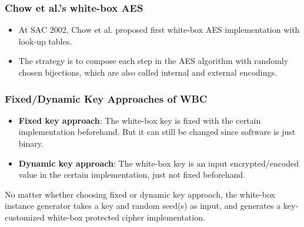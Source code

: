 \documentclass{beamer}
\begin{document}
\frame
{
\frametitle{Chow et al.'s white-box AES}
\begin{itemize}
\item At SAC 2002, Chow et al. proposed first white-box AES implementation with look-up tables.
\item The strategy is to compose each step in the AES algorithm with randomly chosen bijections, which are also called \textcolor[rgb]{1.00,0.00,0.00}{internal and external encodings}.
\end{itemize}

\begin{center}
\end{center}
}

\frame
{
\frametitle{Fixed/Dynamic Key Approaches of WBC}
\begin{itemize}
\item \textbf{Fixed key approach}: The white-box key is fixed with the certain implementation beforehand. \textcolor[rgb]{1.00,0.00,0.00}{But it can still be changed since software is just binary.}

\item \textbf{Dynamic key approach}: The white-box key is an input encrypted/encoded value in the certain implementation, just not fixed beforehand.
\end{itemize}

No matter whether choosing fixed or dynamic key approach, the white-box instance generator takes a key and random seed(s) as input, and generates a key-customized white-box protected cipher implementation.
}
\end{document}
